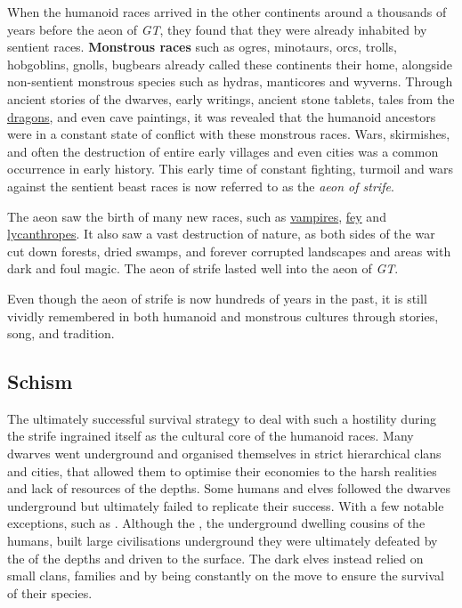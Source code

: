 When the humanoid races arrived in the other continents around a thousands of
years before the aeon of \emph{GT}, they found that they were already
inhabited by sentient races. \textbf{Monstrous races} such as ogres,
minotaurs, orcs, trolls, hobgoblins, gnolls, bugbears already called these
continents their home, alongside non-sentient monstrous species such as
hydras, manticores and wyverns. Through ancient stories of the dwarves, early
writings, ancient stone tablets, tales from the \hyperref[sec:Dragons]{dragons},
and even cave paintings, it was revealed that the humanoid ancestors were in a
constant state of conflict with these monstrous races. Wars, skirmishes, and
often the destruction of entire early villages and even cities was a common
occurrence in early history. This early time of constant fighting, turmoil and
wars against the sentient beast races is now referred to as the \emph{aeon of
  strife}.

The aeon saw the birth of many new races, such as
\hyperref[sec:Vampires]{vampires}, \hyperref[sec:Fey]{fey} and
\hyperref[sec:Lycanthropes]{lycanthropes}. It also saw a vast destruction of
nature, as both sides of the war cut down forests, dried swamps, and forever
corrupted landscapes and areas with dark and foul magic. The aeon of strife
lasted well into the aeon of \emph{GT}.

Even though the aeon of strife is now hundreds of years in the past, it is
still vividly remembered in both humanoid and monstrous cultures through
stories, song, and tradition.

\subsection{Schism}
\label{sec:Schism}

The ultimately successful survival strategy to deal with such a hostility
during the strife ingrained itself as the cultural core of the humanoid
races. Many dwarves went underground and organised themselves in strict
hierarchical clans and cities, that allowed them to optimise their economies to
the harsh realities and lack of resources of the depths. Some humans and elves
followed the dwarves underground but ultimately failed to replicate their
success. With a few notable exceptions, such as .
Although the , the underground dwelling cousins of the
humans, built large civilisations underground they were ultimately defeated by
the  of the depths and driven to the surface. The dark elves
instead relied on small clans, families and by being constantly on the move to
ensure the survival of their species.

